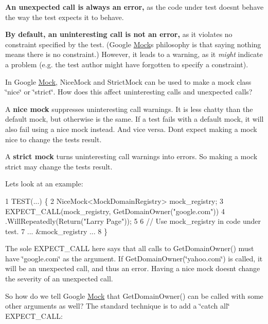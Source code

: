 {\bfseries An unexpected call is always an error,} as the code under test doesn\textquotesingle{}t behave the way the test expects it to behave.

{\bfseries By default, an uninteresting call is not an error,} as it violates no constraint specified by the test. (Google \hyperlink{class_mock}{Mock}\textquotesingle{}s philosophy is that saying nothing means there is no constraint.) However, it leads to a warning, as it {\itshape might} indicate a problem (e.\+g. the test author might have forgotten to specify a constraint).

In Google \hyperlink{class_mock}{Mock}, {\ttfamily Nice\+Mock} and {\ttfamily Strict\+Mock} can be used to make a mock class \char`\"{}nice\char`\"{} or \char`\"{}strict\char`\"{}. How does this affect uninteresting calls and unexpected calls?

A {\bfseries nice mock} suppresses uninteresting call warnings. It is less chatty than the default mock, but otherwise is the same. If a test fails with a default mock, it will also fail using a nice mock instead. And vice versa. Don\textquotesingle{}t expect making a mock nice to change the test\textquotesingle{}s result.

A {\bfseries strict mock} turns uninteresting call warnings into errors. So making a mock strict may change the test\textquotesingle{}s result.

Let\textquotesingle{}s look at an example\+:


\begin{DoxyCode}
1 TEST(...) \{
2   NiceMock<MockDomainRegistry> mock\_registry;
3   EXPECT\_CALL(mock\_registry, GetDomainOwner("google.com"))
4           .WillRepeatedly(Return("Larry Page"));
5 
6   // Use mock\_registry in code under test.
7   ... &mock\_registry ...
8 \}
\end{DoxyCode}


The sole {\ttfamily E\+X\+P\+E\+C\+T\+\_\+\+C\+A\+LL} here says that all calls to {\ttfamily Get\+Domain\+Owner()} must have {\ttfamily \char`\"{}google.\+com\char`\"{}} as the argument. If {\ttfamily Get\+Domain\+Owner(\char`\"{}yahoo.\+com\char`\"{})} is called, it will be an unexpected call, and thus an error. Having a nice mock doesn\textquotesingle{}t change the severity of an unexpected call.

So how do we tell Google \hyperlink{class_mock}{Mock} that {\ttfamily Get\+Domain\+Owner()} can be called with some other arguments as well? The standard technique is to add a \char`\"{}catch all\char`\"{} {\ttfamily E\+X\+P\+E\+C\+T\+\_\+\+C\+A\+LL}\+:


